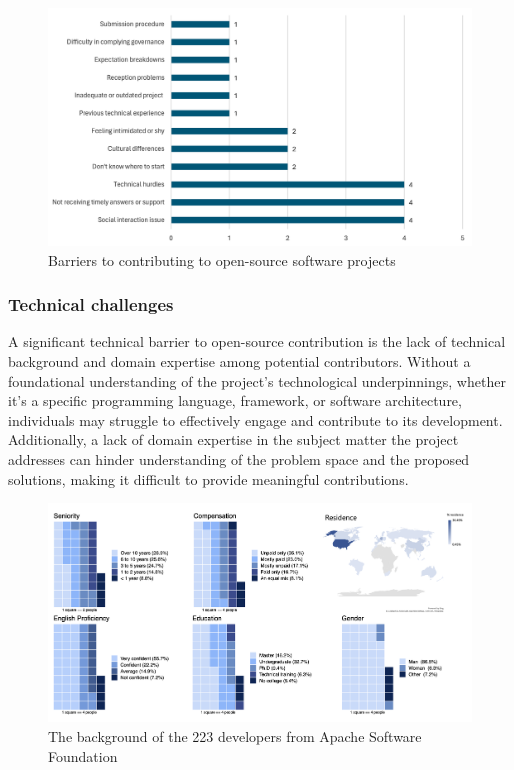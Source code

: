 \begin{figure}[ht]
    \centering
    \includegraphics[width=1\linewidth]{figs/barriers.png}
    \caption{Barriers to contributing to open-source software projects}
    \label{fig:barriers}
\end{figure}



\subsubsection{Technical challenges}

A significant technical barrier to open-source contribution is the lack of technical background and domain expertise among potential contributors. Without a foundational understanding of the project's technological underpinnings, whether it's a specific programming language, framework, or software architecture, individuals may struggle to effectively engage and contribute to its development. Additionally, a lack of domain expertise in the subject matter the project addresses can hinder understanding of the problem space and the proposed solutions, making it difficult to provide meaningful contributions.

\begin{figure}[ht]
    \centering
    \includegraphics[width=1\linewidth]{figs/contributor_background.png}
    \caption{The background of the 223 developers from Apache Software Foundation \cite{04guizani2021long}}
    \label{fig:contributor_background}
\end{figure}

